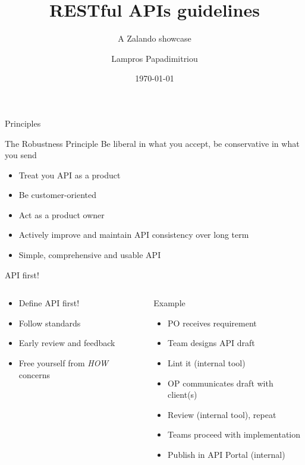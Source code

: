 \documentclass[10pt]{beamer}
\title{RESTful APIs guidelines}
\subtitle{A Zalando showcase}
\date{\today}
\author{Lampros Papadimitriou}
\institute{Check24 Baufinanzierung GmbH}
\begin{document}
\maketitle

\begin{frame}{Principles}

  \begin{alertblock}{The Robustness Principle}
    Be liberal in what you accept, be conservative in what you send
  \end{alertblock}

  \begin{itemize}
    \item Treat you API as a product
    \item Be customer-oriented
    \item Act as a product owner
    \item Actively improve and maintain API consistency over long term
    \item Simple, comprehensive and usable API
  \end{itemize}

\end{frame}

\begin{frame}{API first!}
  \begin{columns}
   	\begin{column}{0.4\textwidth}
	  \begin{itemize}
	    \item Define API first!
		\item Follow standards
		\item Early review and feedback
		\item Free yourself from \emph{HOW} concerns
	  \end{itemize}
   	\end{column}
    \begin{column}{0.6\textwidth}
    Example
    \begin{itemize}
      \item PO receives requirement
      \item Team designs API draft
      \item Lint it (internal tool)
      \item OP communicates draft with client(s)
      \item Review (internal tool), repeat
      \item Teams proceed with implementation
      \item Publish in API Portal (internal)
   	\end{itemize}
   \end{column}
  \end{columns}

\end{frame}
\end{document}
